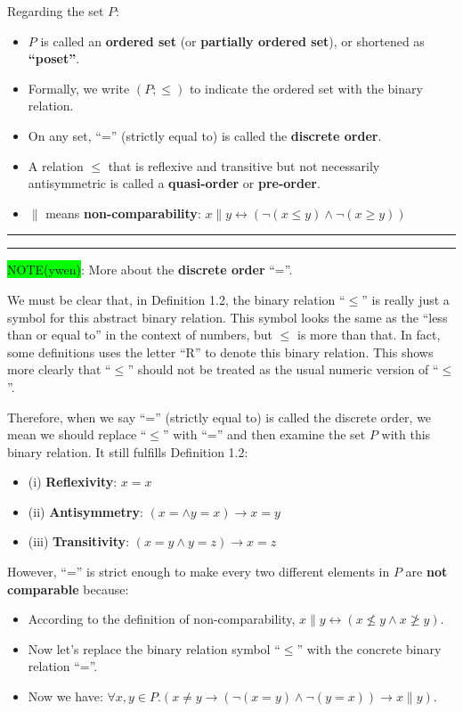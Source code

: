 \documentclass[12pt, letterpaper, oneside]{book}
\begin{document}
Regarding the set $P$:
\begin{itemize}
  \item $P$ is called an \textbf{ordered set} (or \textbf{partially ordered set}), or shortened as \textbf{``poset''}.
  \item Formally, we write $(P; \leqslant)$ to indicate the ordered set with the binary relation.
  \item On any set, ``='' (strictly equal to) is called the \textbf{discrete order}.
  \item A relation $\leqslant$ that is reflexive and transitive but not necessarily antisymmetric is called a
        \textbf{quasi-order} or \textbf{pre-order}.
  \item $\parallel$ means \textbf{non-comparability}: $x \parallel y \leftrightarrow (\lnot (x \leqslant y) \land \lnot (x \geqslant y))$
\end{itemize}

\noindent\rule[-9pt]{1cm}{10pt}\rule{10cm}{0.4pt}

\colorbox{lime}{NOTE(ywen)}: More about the \textbf{discrete order} ``=''.

We must be clear that, in Definition 1.2, the binary relation ``$\leqslant$'' is really just a symbol for this abstract
binary relation. This symbol looks the same as the ``less than or equal to'' in the context of numbers, but $\leqslant$
is more than that. In fact, some definitions uses the letter ``R'' to denote this binary relation. This shows more
clearly that ``$\leqslant$'' should not be treated as the usual numeric version of ``$\leqslant$''.

Therefore, when we say ``='' (strictly equal to) is called the discrete order, we mean we should replace ``$\leqslant$''
with ``='' and then examine the set $P$ with this binary relation. It still fulfills Definition 1.2:
\begin{itemize}
  \item (i) \textbf{Reflexivity}: $x = x$
  \item (ii) \textbf{Antisymmetry}: $(x = \land y = x) \rightarrow x = y$
  \item (iii) \textbf{Transitivity}: $(x = y \land y = z) \rightarrow x = z$
\end{itemize}

However, ``='' is strict enough to make every two different elements in $P$ are \textbf{not comparable} because:
\begin{itemize}
  \item According to the definition of non-comparability, $x \parallel y \leftrightarrow (x \nleqslant y \land x \ngeqslant y)$.
  \item Now let's replace the binary relation symbol ``$\leqslant$'' with the concrete binary relation ``=''.
  \item Now we have: $\forall x, y \in P. (x \ne y \rightarrow (\lnot (x = y) \land \lnot (y = x)) \rightarrow x \parallel y)$.
\end{itemize}
\end{document}
